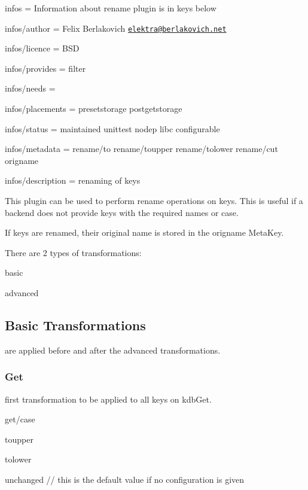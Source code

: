 
\begin{DoxyItemize}
\item infos = Information about rename plugin is in keys below
\item infos/author = Felix Berlakovich \href{mailto:elektra@berlakovich.net}{\tt elektra@berlakovich.\+net}
\item infos/licence = B\+SD
\item infos/provides = filter
\item infos/needs =
\item infos/placements = presetstorage postgetstorage
\item infos/status = maintained unittest nodep libc configurable
\item infos/metadata = rename/to rename/toupper rename/tolower rename/cut origname
\item infos/description = renaming of keys
\end{DoxyItemize}

This plugin can be used to perform rename operations on keys. This is useful if a backend does not provide keys with the required names or case.

If keys are renamed, their original name is stored in the {\ttfamily origname} Meta\+Key.

There are 2 types of transformations\+:
\begin{DoxyItemize}
\item basic
\item advanced
\end{DoxyItemize}

\subsection*{Basic Transformations}

are applied before and after the advanced transformations.

\subsubsection*{Get}

first transformation to be applied to all keys on kdb\+Get.

{\ttfamily get/case}
\begin{DoxyItemize}
\item toupper
\item tolower
\item unchanged // this is the default value if no configuration is given
\end{DoxyItemize}

